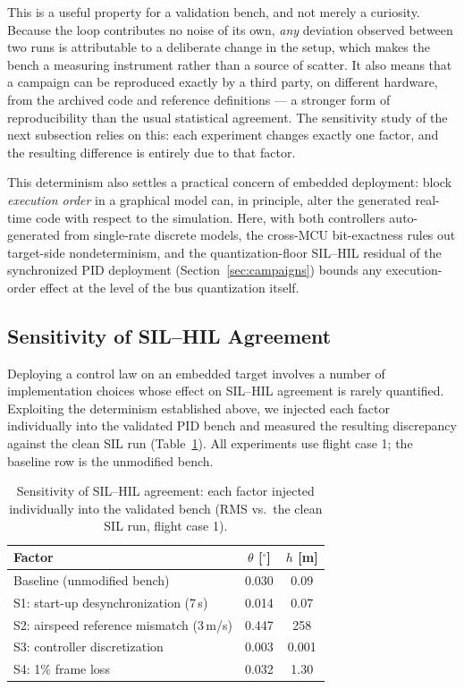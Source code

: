 This is a useful property for a validation bench, and not merely a
curiosity. Because the loop contributes no noise of its own, \emph{any}
deviation observed between two runs is attributable to a deliberate change
in the setup, which makes the bench a measuring instrument rather than a
source of scatter. It also means that a campaign can be reproduced exactly
by a third party, on different hardware, from the archived code and
reference definitions --- a stronger form of reproducibility than the
usual statistical agreement. The sensitivity study of the next subsection
relies on this: each experiment changes exactly one factor, and the
resulting difference is entirely due to that factor.

This determinism also settles a practical concern of embedded
deployment: block \emph{execution order} in a graphical model can, in
principle, alter the generated real-time code with respect to the
simulation. Here, with both controllers auto-generated from single-rate
discrete models, the cross-MCU bit-exactness rules out target-side
nondeterminism, and the quantization-floor SIL--HIL residual of the
synchronized PID deployment (Section~\ref{sec:campaigns}) bounds any
execution-order effect at the level of the bus quantization itself.

\subsection{Sensitivity of SIL--HIL Agreement}
\label{sec:sensitivity}
Deploying a control law on an embedded target involves a number of
implementation choices whose effect on SIL--HIL agreement is rarely
quantified. Exploiting the determinism established above, we injected each
factor individually into the validated PID bench and measured the
resulting discrepancy against the clean SIL run
(Table~\ref{tab:sensitivity}). All experiments use flight case 1; the
baseline row is the unmodified bench.

\begin{table}[!t]
\caption{Sensitivity of SIL--HIL agreement: each factor injected
individually into the validated bench (RMS vs.\ the clean SIL run, flight
case 1).}
\label{tab:sensitivity}
\centering
\begin{tabular}{lcc}
\toprule
Factor & $\theta$ [$^\circ$] & $h$ [m] \\
\midrule
Baseline (unmodified bench) & 0.030 & 0.09 \\
S1: start-up desynchronization (7\,s) & 0.014 & 0.07 \\
S2: airspeed reference mismatch (3\,m/s) & 0.447 & 258 \\
S3: controller discretization & 0.003 & 0.001 \\
S4: 1\% frame loss & 0.032 & 1.30 \\
\bottomrule
\end{tabular}
\end{table}

